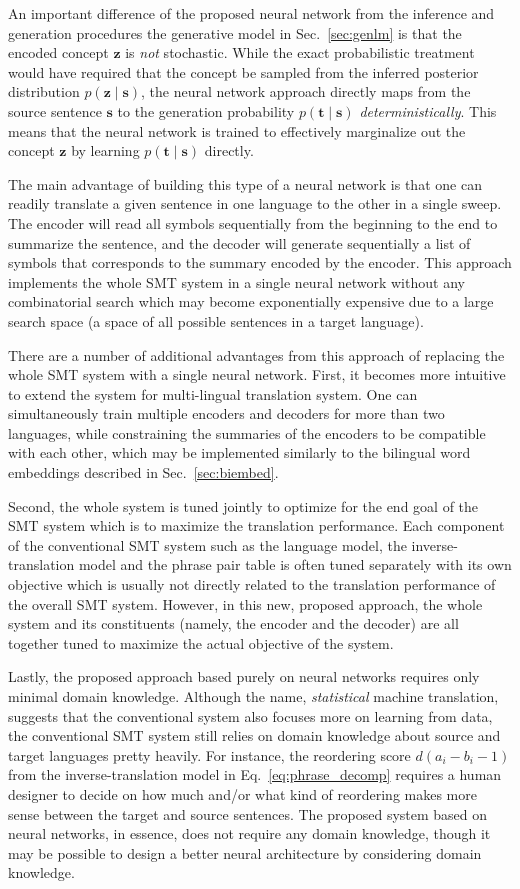 \documentclass[11pt, oneside]{essay}
\newcommand{\vect}[1]{\mathbf{#1}}
\newcommand{\vs}[0]{\vect{s}}
\newcommand{\vt}[0]{\vect{t}}
\newcommand{\vz}[0]{\vect{z}}
\begin{document}
An important difference of the proposed neural network from the
inference and generation procedures the generative model in
Sec.~\ref{sec:genlm} is that the encoded concept $\vz$ is
\textit{not} stochastic. While the exact probabilistic treatment
would have required that the concept be sampled from the inferred
posterior distribution $p(\vz \mid \vs)$, the neural network
approach directly maps from the source sentence $\vs$ to the
generation probability $p(\vt\mid \vs)$
\textit{deterministically}. This means that the neural network is
trained to effectively marginalize out the concept $\vz$ by
learning $p(\vt \mid \vs)$ directly.

The main advantage of building this type of a neural network  is
that one can readily translate a given sentence in one language
to the other in a single sweep. The encoder will read all symbols
sequentially from the beginning to the end to summarize the
sentence, and the decoder will generate sequentially a list of
symbols that corresponds to the summary encoded by the encoder.
This approach implements the whole SMT system in a single neural
network without any combinatorial search which may become
exponentially expensive due to a large search space (a space of
all possible sentences in a target language).

There are a number of additional advantages from this approach of
replacing the whole SMT system with a single neural network.
First, it becomes more intuitive to extend the system for
multi-lingual translation system. One can simultaneously train
multiple encoders and decoders for more than two languages, while
constraining the summaries of the encoders to be compatible with
each other, which may be implemented similarly to the bilingual
word embeddings described in Sec.~\ref{sec:biembed}. 

Second, the whole system is tuned jointly to optimize for the end
goal of the SMT system which is to maximize the translation
performance. Each component of the conventional SMT system such
as the language model, the inverse-translation model and the
phrase pair table is often tuned separately with its own
objective which is usually not directly related to the
translation performance of the overall SMT system. However, in
this new, proposed approach, the whole system and its
constituents (namely, the encoder and the decoder) are all
together tuned to maximize the actual objective of the system.

Lastly, the proposed approach based purely on neural networks
requires only minimal domain knowledge. Although the name,
\textit{statistical} machine translation, suggests that
the conventional system also focuses more on learning
from data, the conventional SMT system still relies on
domain knowledge about source and target languages
pretty heavily. For instance, the reordering score
$d(a_i -b_i -1)$ from the inverse-translation model in
Eq.~\eqref{eq:phrase_decomp} requires a human designer
to decide on how much and/or what kind of reordering
makes more sense between the target and source
sentences. The proposed system based on neural networks, in
essence, does not require any domain knowledge, though it may be
possible to design a better neural architecture by considering
domain knowledge.
\end{document}
